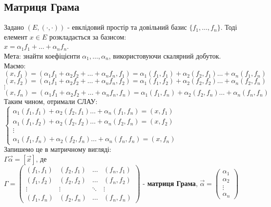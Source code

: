 \documentclass[a4paper, 10pt]{article}
\theoremstyle{theoremdd}
\begin{document}
\subsection{Матриця Грама}
Задано $(E,(\cdot,\cdot))$ - евклідовий простір та довільний базис $\{f_1,\dots,f_n\}$. Тоді елемент $x \in E$ розкладається за базисом:\\
$x = \alpha_1 f_1 + \dots + \alpha_n f_n$.\\
Мета: знайти коефіцієнти $\alpha_1,\dots,\alpha_n$, використовуючи скалярний добуток.\\
Маємо:\\
$(x,f_1) = (\alpha_1 f_1 + \alpha_2 f_2 + \dots + \alpha_n f_n, f_1) = \alpha_1 (f_1,f_1) + \alpha_2 (f_2,f_1) \dots + \alpha_n (f_1,f_n)$\\
$(x,f_2) = (\alpha_1 f_1 + \alpha_2 f_2 + \dots + \alpha_n f_n, f_2) = \alpha_1 (f_1,f_2) + \alpha_2 (f_2,f_2) \dots + \alpha_n (f_2,f_n)$\\
$\vdots$\\
$(x,f_n) = (\alpha_1 f_1 + \alpha_2 f_2 + \dots + \alpha_n f_n, f_n) = \alpha_1 (f_1,f_n) + \alpha_2 (f_2,f_n) \dots + \alpha_n (f_n,f_n)$\\
Таким чином, отримали СЛАУ:\\
$\begin{cases}
\alpha_1 (f_1,f_1) + \alpha_2 (f_2,f_1) \dots + \alpha_n (f_1,f_n) = (x,f_1) \\
\alpha_1 (f_1,f_2) + \alpha_2 (f_2,f_2) \dots + \alpha_n (f_2,f_n) = (x,f_2) \\
\vdots \\
\alpha_1 (f_1,f_n) + \alpha_2 (f_2,f_n) \dots + \alpha_n (f_n,f_n) = (x,f_n)
\end{cases}$\\
Запишемо це в матричному вигляді:\\
$\Gamma \vec{\alpha} = [\vec{x}]$, де\\
$\Gamma = \begin{pmatrix}
(f_1,f_1) & (f_2,f_1) & \dots & (f_n,f_1) \\
(f_1,f_2) & (f_2,f_2) & \dots & (f_n,f_2) \\
\vdots & \vdots & \ddots & \vdots \\
(f_1,f_n) & (f_2,f_n) & \dots & (f_n,f_n)
\end{pmatrix}$ - \textbf{матриця Грама}, \hspace{0.5cm}
$\vec{\alpha} = \begin{pmatrix}
\alpha_1 \\ \alpha_2 \\ \vdots \\ \alpha_n
\end{pmatrix}$ \hspace{1cm}
\end{document}
